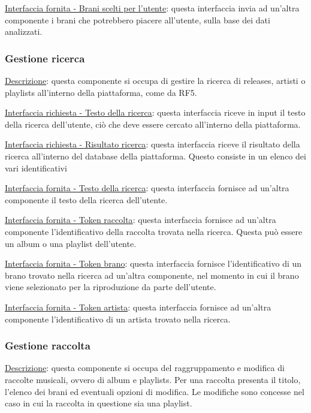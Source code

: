 \documentclass[a4paper,12pt]{article}
\begin{document}
\underline{Interfaccia fornita - Brani scelti per l’utente}: questa interfaccia invia ad un’altra componente i brani che potrebbero piacere all’utente, sulla base dei dati analizzati.

\subsubsection{Gestione ricerca}

\underline{Descrizione}: questa componente si occupa di gestire la ricerca di releases, artisti o playlists all’interno della piattaforma, come da RF5.

\underline{Interfaccia richiesta - Testo della ricerca}: questa interfaccia riceve in input il testo della ricerca dell’utente, ciò che deve essere cercato all’interno della piattaforma.

\underline{Interfaccia richiesta - Risultato ricerca}: questa interfaccia riceve il risultato della ricerca all’interno del database della piattaforma. Questo consiste in un elenco dei vari identificativi

\underline{Interfaccia fornita - Testo della ricerca}: questa interfaccia fornisce ad un’altra componente il testo della ricerca dell’utente.

\underline{Interfaccia fornita - Token raccolta}: questa interfaccia fornisce ad un’altra componente l’identificativo della raccolta trovata nella ricerca. Questa può essere un album o una playlist dell’utente.

\underline{Interfaccia fornita - Token brano}: questa interfaccia fornisce l’identificativo di un brano trovato nella ricerca ad un’altra componente, nel momento in cui il brano viene selezionato per la riproduzione da parte dell’utente.

\underline{Interfaccia fornita - Token artista}: questa interfaccia fornisce ad un’altra componente l’identificativo di un artista trovato nella ricerca.

\subsubsection{Gestione raccolta}

\underline{Descrizione}: questa componente si occupa del raggruppamento e modifica di raccolte musicali, ovvero di album e playlists. Per una raccolta presenta il titolo, l’elenco dei brani ed eventuali opzioni di modifica. Le modifiche sono concesse nel caso in cui la raccolta in questione sia una playlist.
\end{document}
